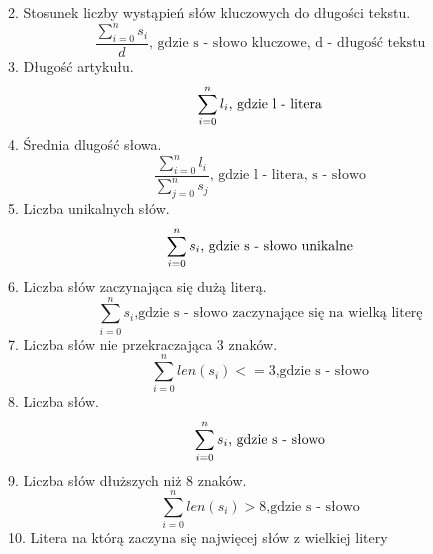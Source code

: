 \documentclass{classrep}
\begin{document}
2. Stosunek liczby wystąpień słów kluczowych do długości tekstu.\\
\begin{displaymath}
\frac{\sum_{i=0}^{n}s_i}{d}\textrm{, gdzie s - słowo kluczowe, d - długość tekstu}
\end{displaymath}
3. Długość artykułu.\\
\begin{displaymath}
\sum_{i = 0}^{n} l_i \textrm{, gdzie l - litera}\\
\end{displaymath}
4. Średnia dlugość słowa.\\
\begin{displaymath}
\frac{\sum_{i=0}^{n}l_i}{\sum_{j=0}^{n}s_j}\textrm{, gdzie l - litera, s - słowo}
\end{displaymath}
5. Liczba unikalnych słów.\\
\begin{displaymath}
\sum_{i = 0}^{n} s_i \textrm{, gdzie s - słowo unikalne}\\
\end{displaymath}
6. Liczba słów zaczynająca się dużą literą.\\
\begin{displaymath}
\sum_{i=0}^{n}s_i \textrm{,gdzie s - słowo zaczynające się na wielką literę}
\end{displaymath}
7. Liczba słów nie przekraczająca 3 znaków.\\
\begin{displaymath}
\sum_{i=0}^{n}len(s_i)<= 3 \textrm{,gdzie s - słowo}
\end{displaymath}
8. Liczba słów.\\
\begin{displaymath}
\sum_{i = 0}^{n} s_i \textrm{, gdzie s - słowo}\\
\end{displaymath}
9. Liczba słów dłuższych niż 8 znaków.\\
\begin{displaymath}
\sum_{i=0}^{n}len(s_i) > 8 \textrm{,gdzie s - słowo}
\end{displaymath}
10. Litera na którą zaczyna się najwięcej słów z wielkiej litery \\ 
\noindent
\end{document}
